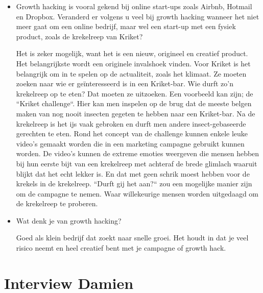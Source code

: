 \begin{itemize}
	\item Growth hacking is vooral gekend bij online start-ups zoals Airbnb, Hotmail en Dropbox. Veranderd er volgens u veel bij growth hacking wanneer het niet meer gaat om een online bedrijf, maar wel een start-up met een fysiek product, zoals de krekelreep van Kriket?
	
	Het is zeker mogelijk, want het is een nieuw, origineel en creatief product. Het belangrijkste wordt een originele invalshoek vinden. Voor Kriket is het belangrijk om in te spelen op de actualiteit, zoals het klimaat. Ze moeten zoeken naar wie er geïnteresseerd is in een Kriket-bar. Wie durft zo'n krekelreep op te eten? Dat moeten ze uitzoeken. Een voorbeeld kan zijn; de ``Kriket challenge``. Hier kan men inspelen op de brug dat de meeste belgen maken van nog nooit insecten gegeten te hebben naar een Kriket-bar. Na de krekelreep is het ijs vaak gebroken en durft men andere insect-gebaseerde gerechten te eten. Rond het concept van de challenge kunnen enkele leuke video's gemaakt worden die in een marketing campagne gebruikt kunnen worden. De video's kunnen de extreme emoties weergeven die mensen hebben bij hun eerste bijt van een krekelreep met achteraf de brede glimlach waaruit blijkt dat het echt lekker is. En dat met geen schrik moest hebben voor de krekels in de krekelreep. ``Durft gij het aan?`` zou een mogelijke manier zijn om de campagne te nemen. Waar willekeurige mensen worden uitgedaagd om de krekelreep te proberen.
	
	\item Wat denk je van growth hacking? 
	
	Goed als klein bedrijf dat zoekt naar snelle groei. Het houdt in dat je veel risico neemt en heel creatief bent met je campagne of growth hack.
	
\end{itemize}


\section{Interview Damien}
\label{sec:interview-damien}

